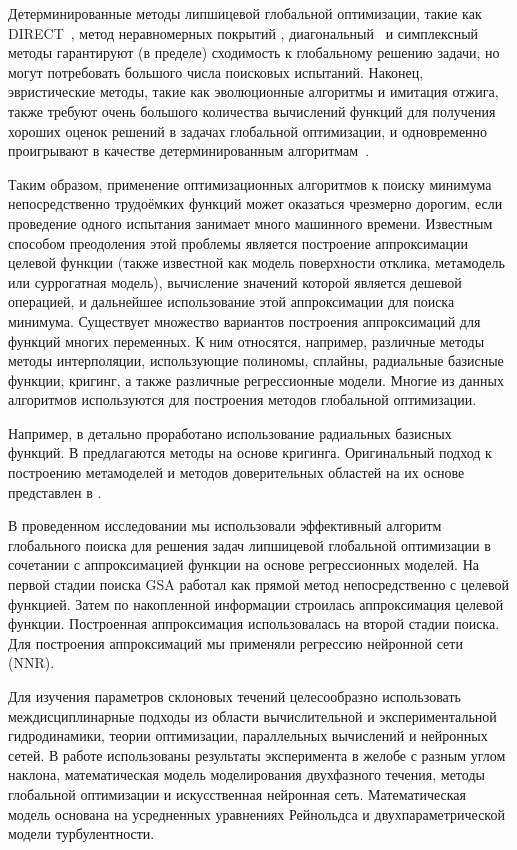 \documentclass[mathematics,article,accept,pdftex,moreauthors]{Definitions/mdpi}
\begin{document}
Детерминированные методы липшицевой глобальной оптимизации, такие как DIRECT~\cite{Jones2009}, метод неравномерных покрытий \cite{Evtushenko2009,Evtushenko2013}, диагональный~\cite{Sergeyev2017} и симплексный~\cite{Zilinskas2014} методы гарантируют (в пределе) сходимость к глобальному решению задачи, но могут потребовать большого числа поисковых испытаний.
Наконец, эвристические методы, такие как эволюционные алгоритмы и имитация отжига, также требуют очень большого количества вычислений функций для получения хороших оценок решений в задачах глобальной оптимизации, и одновременно проигрывают в качестве  детерминированным алгоритмам~\cite{Sergeyev2018,Kvasov2018}.

Таким образом, применение оптимизационных алгоритмов к поиску минимума непосредственно трудоёмких функций может оказаться чрезмерно дорогим, если проведение одного испытания занимает много машинного времени.
Известным способом преодоления этой проблемы является построение аппроксимации целевой функции (также известной как модель поверхности отклика, метамодель или суррогатная модель), вычисление значений которой является дешевой операцией, и дальнейшее использование этой аппроксимации для поиска минимума. 
Существует множество вариантов построения аппроксимаций для функций многих переменных. К ним относятся, например, различные методы методы интерполяции, использующие полиномы, сплайны, радиальные базисные функции, кригинг, а также различные регрессионные модели. Многие из данных алгоритмов используются для построения методов глобальной оптимизации. 

Например, в \cite{Gutmann2001,Regis2005} детально проработано использование радиальных базисных функций. В \cite{Jones1998,UrRehman2014,Ollar2017_1} предлагаются методы на основе кригинга. Оригинальный подход к построению метамоделей и методов доверительных областей на их основе представлен в \cite{Polynkin2012,Ollar2017_2,Toropov2018}. 

В проведенном исследовании мы использовали эффективный алгоритм глобального поиска \cite{Strongin2000,Sergeyev2013} для решения задач липшицевой глобальной оптимизации в сочетании с аппроксимацией функции на основе регрессионных моделей. На первой стадии поиска GSA работал как прямой метод непосредственно с целевой функцией. Затем по накопленной информации строилась аппроксимация целевой функции. Построенная аппроксимация использовалась на второй стадии поиска.
Для построения аппроксимаций мы применяли регрессию нейронной сети (NNR). 


Для изучения параметров склоновых течений целесообразно использовать междисциплинарные подходы из области вычислительной и экспериментальной гидродинамики, теории оптимизации, параллельных вычислений и нейронных сетей. В работе использованы результаты эксперимента в желобе с разным углом наклона, математическая модель моделирования двухфазного течения, методы глобальной оптимизации и искусственная нейронная сеть. Математическая модель основана на усредненных уравнениях Рейнольдса и двухпараметрической модели турбулентности.
\end{document}
